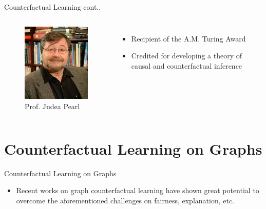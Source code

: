 \documentclass[aspectratio=169,xcolor=dvipsnames]{beamer}
\begin{document}
	\begin{frame}{Counterfactual Learning cont..}
		\begin{columns}[c] %
			
			\begin{figure}
				\includegraphics[width=0.8\linewidth]{judea pearl.jpg}
				\caption{Prof. Judea Pearl}
			\end{figure}
			
			\begin{itemize}
				\item Recipient of the A.M. Turing Award
				\item  Credited for developing a theory of causal and counterfactual inference
			\end{itemize}
			
		\end{columns}
	\end{frame}
	\section{Counterfactual Learning on Graphs}
		
	
	\begin{frame}{Counterfactual Learning on Graphs}
		\begin{itemize}
			\item Recent works on graph counterfactual learning have shown great potential to overcome the aforementioned challenges 	on fairness, explanation, etc.
		\end{itemize}
	\end{frame}
	
\end{document}
